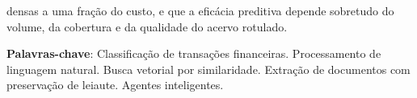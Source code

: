 \begin{resumo}
densas a uma fração do custo, e que a eficácia preditiva depende sobretudo do volume, da cobertura e da qualidade do acervo rotulado.


 \textbf{Palavras-chave}: Classificação de transações financeiras. Processamento de linguagem natural. Busca vetorial por similaridade. Extração de documentos com preservação de leiaute. Agentes inteligentes.
\end{resumo}
